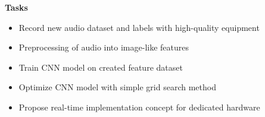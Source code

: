 \documentclass[xcolor=dvipsnames,aspectratio=169,beamer]{beamer}
\begin{document}
\begin{frame}
	\textbf{Tasks}
	\begin{itemize}
	\item<1-> Record new audio dataset and labels with high-quality equipment
	\item<2-> Preprocessing of audio into image-like features
	\item<3-> Train CNN model on created feature dataset
	\item<4-> Optimize CNN model with simple grid search method
	\item<5-> Propose real-time implementation concept for dedicated hardware
	\end{itemize}
	\vspace{5mm}
\end{frame}
\end{document}
